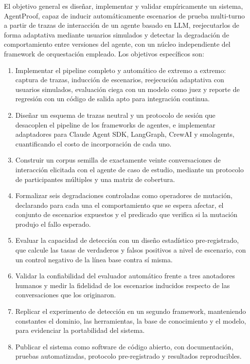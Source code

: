 El objetivo general es diseñar, implementar y validar empíricamente un sistema, AgentProof, capaz de inducir automáticamente escenarios de prueba multi-turno a partir de trazas de interacción de un agente basado en LLM, reejecutarlos de forma adaptativa mediante usuarios simulados y detectar la degradación de comportamiento entre versiones del agente, con un núcleo independiente del framework de orquestación empleado. Los objetivos específicos son:
\par
\begin{enumerate}[label=\arabic*.,leftmargin=0.5in,labelwidth=0.25in,labelsep=0pt,align=left,itemsep=0pt,parsep=0pt,topsep=0pt]
  \item Implementar el pipeline completo y automático de extremo a extremo: captura de trazas, inducción de escenarios, reejecución adaptativa con usuarios simulados, evaluación ciega con un modelo como juez y reporte de regresión con un código de salida apto para integración continua.
  \item Diseñar un esquema de trazas neutral y un protocolo de sesión que desacoplen el pipeline de los frameworks de agentes, e implementar adaptadores para Claude Agent SDK, LangGraph, CrewAI y smolagents, cuantificando el costo de incorporación de cada uno.
  \item Construir un corpus semilla de exactamente veinte conversaciones de interacción elicitada con el agente de caso de estudio, mediante un protocolo de participantes múltiples y una matriz de cobertura.
  \item Formalizar seis degradaciones controladas como operadores de mutación, declarando para cada una el comportamiento que se espera afectar, el conjunto de escenarios expuestos y el predicado que verifica si la mutación produjo el fallo esperado.
  \item Evaluar la capacidad de detección con un diseño estadístico pre-registrado, que calcule las tasas de verdaderos y falsos positivos a nivel de escenario, con un control negativo de la línea base contra sí misma.
  \item Validar la confiabilidad del evaluador automático frente a tres anotadores humanos y medir la fidelidad de los escenarios inducidos respecto de las conversaciones que los originaron.
  \item Replicar el experimento de detección en un segundo framework, manteniendo constantes el dominio, las herramientas, la base de conocimiento y el modelo, para evidenciar la portabilidad del sistema.
  \item Publicar el sistema como software de código abierto, con documentación, pruebas automatizadas, protocolo pre-registrado y resultados reproducibles.
\end{enumerate}


